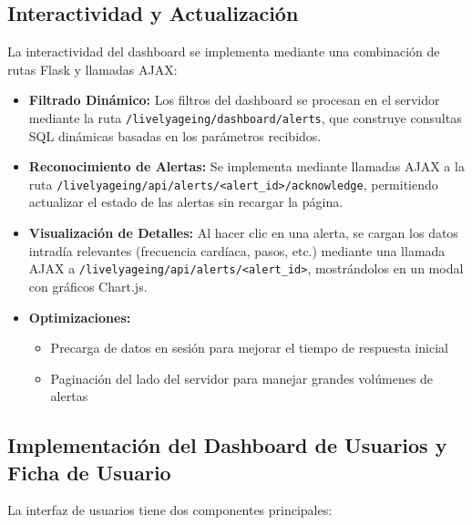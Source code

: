 \subsection{Interactividad y Actualización}
\label{subsec:interactividad}

La interactividad del dashboard se implementa mediante una combinación de rutas Flask y llamadas AJAX:

\begin{itemize}
    \item \textbf{Filtrado Dinámico:} Los filtros del dashboard se procesan en el servidor mediante la ruta \texttt{/livelyageing/dashboard/alerts}, que construye consultas SQL dinámicas basadas en los parámetros recibidos.
    \item \textbf{Reconocimiento de Alertas:} Se implementa mediante llamadas AJAX a la ruta \texttt{/livelyageing/api/alerts/<alert\_id>/acknowledge}, permitiendo actualizar el estado de las alertas sin recargar la página.
    \item \textbf{Visualización de Detalles:} Al hacer clic en una alerta, se cargan los datos intradía relevantes (frecuencia cardíaca, pasos, etc.) mediante una llamada AJAX a \texttt{/livelyageing/api/alerts/<alert\_id>}, mostrándolos en un modal con gráficos Chart.js.
    \item \textbf{Optimizaciones:}
        \begin{itemize}
            \item Precarga de datos en sesión para mejorar el tiempo de respuesta inicial
            \item Paginación del lado del servidor para manejar grandes volúmenes de alertas
        \end{itemize}
\end{itemize}

\subsection{Implementación del Dashboard de Usuarios y Ficha de Usuario}
\label{subsec:impl_dashboard_usuarios}

La interfaz de usuarios tiene dos componentes principales:

